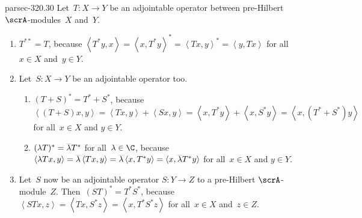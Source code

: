 \documentclass[b5page]{book}
\begin{document}
\begin{solution}{parsec-320.30}%
Let~$T\colon X\to Y$ be an adjointable operator
between pre-Hilbert $\scrA$-modules~$X$ and~$Y$.
\begin{enumerate}
\item
$T^{**}=T$,
because 
$\left<T^*y,x\right>
= \left<x,T^*y\right>^* 
= \left<Tx,y\right>^*
= \left<y,Tx\right>$
for all~$x\in X$ and~$y\in Y$.
\item
Let~$S\colon X\to Y$ be an adjointable operator too.
\begin{enumerate}
\item
$(T+S)^*=T^*+S^*$,
because $\left<(T+S)x,y\right>
= \left<Tx,y\right>+\left<Sx,y\right>
= \left<x,T^*y\right>+\left<x,S^*y\right>
= \left<x,(T^*+S^*)y\right>$
for all~$x\in X$ and $y\in Y$.
\item
$(\lambda T)^* = \smash{\overline{\lambda}}T^*$
for all~$\lambda\in \C$,
because $\left<\lambda Tx,y\right>
= \smash{\overline{\lambda}}\left<Tx,y\right>
= \smash{\overline{\lambda}}\left<x,T^*y\right>
= \left<x,\smash{\overline{\lambda}}T^*y\right>$
for all~$x\in X$ and $y\in Y$.
\end{enumerate}

\item
Let~$S$ now be an adjointable operator
$S\colon Y\to Z$
to a pre-Hilbert $\scrA$-module~$Z$.
Then~$(ST)^*=T^*S^*$,
because
$\left<STx,z\right>
= \left<Tx,S^*z\right>
= \left<x,T^*S^*z\right>$
for all~$x\in X$ and~$z\in Z$.
\end{enumerate}
\end{solution}
\end{document}
